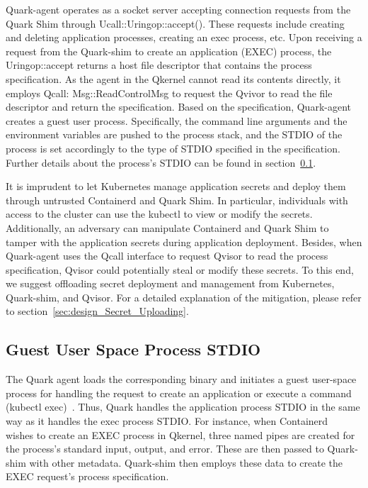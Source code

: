 Quark-agent operates as a socket server accepting connection requests from the Quark Shim through Ucall::Uringop::accept(). These requests include creating and deleting application processes, creating an exec process, etc. Upon receiving a request from the Quark-shim to create an application (EXEC) 
 process, the Uringop::accept returns a host file descriptor that contains the process specification. As the agent in the Qkernel cannot read its contents directly, it employs Qcall: Msg::ReadControlMsg to request the Qvivor to read the file descriptor and return the specification. Based on the 
 specification, Quark-agent creates a guest user process. Specifically, the command line arguments and the environment variables are pushed to the process stack, and the STDIO of the process is set accordingly to the type of STDIO specified in the specification. Further details about the process’s 
 STDIO can be found in section~\ref{sec:security_analyse_STDIO}.

It is imprudent to let Kubernetes manage application secrets and deploy them through untrusted Containerd and Quark Shim. In particular, individuals with access to the cluster can use the kubectl to view or modify the secrets. Additionally, an adversary can manipulate Containerd 
and Quark Shim to tamper with the application secrets during application deployment. Besides, when Quark-agent uses the Qcall interface to request Qvisor to read the process specification, Qvisor could potentially steal or modify these secrets. To this end, we suggest offloading secret deployment and management 
from Kubernetes, Quark-shim, and Qvisor. For a detailed explanation of the mitigation, please refer to section~\ref*{sec:design_Secret_Uploading}.

\subsection{Guest User Space Process STDIO}
\label{sec:security_analyse_STDIO}

The Quark agent loads the corresponding binary and initiates a guest user-space process for handling the request to create an application or execute a command (kubectl exec)~\cite*{k8s}. Thus, Quark handles the application process STDIO in the same way as it handles the exec process STDIO. For instance, 
when Containerd~\cite*{containerd} wishes to create an EXEC process in Qkernel, three named pipes are created for the process’s standard input, output, and error. These are then passed to Quark-shim with other metadata. Quark-shim then employs these data to create the  EXEC request’s process 
specification.

